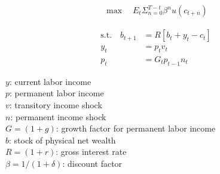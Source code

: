 \begin{align}
\max \quad E_t \Sigma_{n=0}^{T-t} \beta^{n}u(c_{t+n})
\end{align}

\begin{align} \text{s.t.} \quad b_{t+1} &= R[b_t + y_t - c_t]\\
y_t &= p_tv_t\\
p_t &= G_tp_{t-1}n_t 
\end{align}

\bigskip

$y$: current labor income \\

$p$: permanent labor income \\

$v$: transitory income shock \\

$n$: permanent income shock \\

$G = (1+g)$: growth factor for permanent labor income \\

$b$: stock of physical net wealth \\

$R = (1+r)$: gross interest rate \\

$\beta = 1/(1+\delta)$: discount factor \\